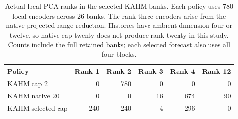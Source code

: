 \begin{table}[htbp]
\centering\small
\begin{tabular}{@{}lrrrrr@{}}
\toprule
Policy & Rank 1 & Rank 2 & Rank 3 & Rank 4 & Rank 12 \\
\midrule
KAHM cap 2 & 0 & 780 & 0 & 0 & 0 \\
KAHM native 20 & 0 & 0 & 16 & 674 & 90 \\
KAHM selected cap & 240 & 240 & 4 & 296 & 0 \\
\bottomrule
\end{tabular}
\caption{Actual local PCA ranks in the selected KAHM banks.
Each policy uses 780 local encoders across 26 banks. The rank-three
encoders arise from the native projected-range reduction. Histories
have ambient dimension four or twelve, so native cap twenty does not
produce rank twenty in this study. Counts include the full retained
banks; each selected forecast also uses all four blocks.}
\label{tab:dimension-policy-ranks}
\end{table}

